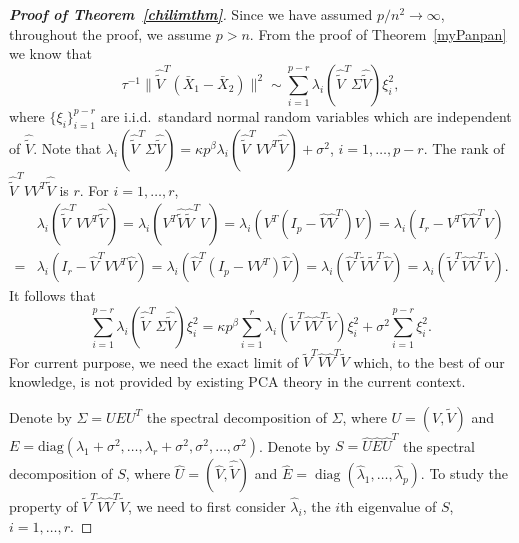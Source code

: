 \documentclass[review]{elsarticle}
\DeclareMathOperator{\mydiag}{diag}
\theoremstyle{plain}
\theoremstyle{definition}
\theoremstyle{remark}
\begin{document}
\begin{proof}[\textbf{Proof of Theorem~\ref{chilimthm}}]
    Since we have assumed $p/n^2\to \infty$, throughout the proof, we assume $p>n$.
    From the proof of Theorem~\ref{myPanpan} we know that 
\begin{equation*}
    \tau^{-1}\big\|\hat{\tilde{V}}^T(\bar{X}_1-\bar{X}_2)\big\|^2
\sim
    \sum_{i=1}^{p-r} \lambda_i(\hat{\tilde{V}}^T\Sigma\hat{\tilde{V}})\xi_i^2,
\end{equation*}
where $\{\xi_i\}_{i=1}^{p-r}$ are i.i.d.\  standard normal random variables which are independent of $\hat{\tilde{V}}$.
Note that
$\lambda_i(\hat{\tilde{V}}^T\Sigma\hat{\tilde{V}})
   = 
    \kappa p^{\beta}\lambda_i(\hat{\tilde{V}}^TVV^T\hat{\tilde{V}})+\sigma^2
    $, $i=1,\ldots, p-r$.
    The rank of $\hat{\tilde{V}}^TVV^T\hat{\tilde{V}}$ is $r$. For $i=1,\ldots, r$,
    \begin{equation*}
        \begin{aligned}
            &\lambda_i(\hat{\tilde{V}}^TVV^T\hat{\tilde{V}})=
    \lambda_i(V^T\hat{\tilde{V}}\hat{\tilde{V}}^TV)=
            \lambda_i(V^T(I_p-\hat{V}\hat{V}^T)V)=
            \lambda_i(I_r-V^T\hat{V}\hat{V}^T V)\\
            =&
            \lambda_i(I_r-\hat{V}^T VV^T\hat{V})=
            \lambda_i(\hat{V}^T(I_p- VV^T)\hat{V})=
            \lambda_i(\hat{V}^T \tilde{V}\tilde{V}^T\hat{V})=
            \lambda_i(\tilde{V}^T\hat{V}\hat{V}^T \tilde{V}).
        \end{aligned}
    \end{equation*}
    It follows that
    \begin{equation}\label{aimafenjie}
    \sum_{i=1}^{p-r} \lambda_i(\hat{\tilde{V}}^T\Sigma\hat{\tilde{V}})\xi_i^2
=
    \kappa p^{\beta}\sum_{i=1}^r \lambda_i(\tilde{V}^T\hat{V}\hat{V}^T\tilde{V})\xi_i^2+
    \sigma^2\sum_{i=1}^{p-r}\xi_i^2.
\end{equation}
For current purpose, we need the exact limit of $\tilde{V}^T\hat{V}\hat{V}^T\tilde{V}$ which, to the best of our knowledge,
is not provided by existing PCA theory in the current context.

Denote by $\Sigma=UEU^T$ the spectral decomposition of $\Sigma$, where $U=(V,\tilde{V})$ and $E=\mathrm{diag}(\lambda_1+\sigma^2,\ldots,\lambda_r+\sigma^2,\sigma^2,\ldots,\sigma^2)$.
    Denote by $S=\hat{U}\hat{E}\hat{U}^T$ the spectral decomposition of $S$, where $\hat{U}=(\hat{V},\hat{\tilde{V}})$ and $\hat{E}=\mydiag(\hat{\lambda}_1,\ldots,\hat{\lambda}_p)$.
    To study the property of $\tilde{V}^T\hat{V}\hat{V}^T\tilde{V}$, we need to first consider $\hat{\lambda}_i$, the $i$th eigenvalue of $S$, $i=1,\ldots, r$.


\end{proof}
\end{document}
